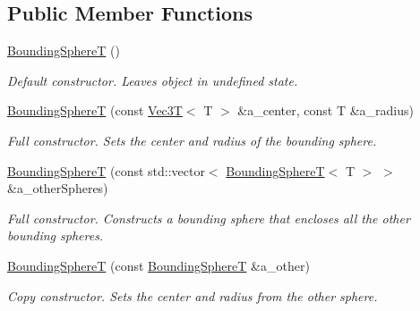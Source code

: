 \subsection*{Public Member Functions}
\begin{DoxyCompactItemize}
\item 
\mbox{\label{classEBGeometry_1_1BoundingVolumes_1_1BoundingSphereT_abb47115bf4bd00e16c885a3b8f54dc87}} 
\hyperlink{classEBGeometry_1_1BoundingVolumes_1_1BoundingSphereT_abb47115bf4bd00e16c885a3b8f54dc87}{Bounding\+SphereT} ()
\begin{DoxyCompactList}\small\item\em Default constructor. Leaves object in undefined state. \end{DoxyCompactList}\item 
\hyperlink{classEBGeometry_1_1BoundingVolumes_1_1BoundingSphereT_a67800669cf2aee6493ea0da5439a34fd}{Bounding\+SphereT} (const \hyperlink{classVec3T}{Vec3T}$<$ T $>$ \&a\+\_\+center, const T \&a\+\_\+radius)
\begin{DoxyCompactList}\small\item\em Full constructor. Sets the center and radius of the bounding sphere. \end{DoxyCompactList}\item 
\hyperlink{classEBGeometry_1_1BoundingVolumes_1_1BoundingSphereT_af360a46fe3463a27f9a718e328aff46e}{Bounding\+SphereT} (const std\+::vector$<$ \hyperlink{classEBGeometry_1_1BoundingVolumes_1_1BoundingSphereT}{Bounding\+SphereT}$<$ T $>$ $>$ \&a\+\_\+other\+Spheres)
\begin{DoxyCompactList}\small\item\em Full constructor. Constructs a bounding sphere that encloses all the other bounding spheres. \end{DoxyCompactList}\item 
\hyperlink{classEBGeometry_1_1BoundingVolumes_1_1BoundingSphereT_ab55488a8ee4b749e8b86c5577735eb3b}{Bounding\+SphereT} (const \hyperlink{classEBGeometry_1_1BoundingVolumes_1_1BoundingSphereT}{Bounding\+SphereT} \&a\+\_\+other)
\begin{DoxyCompactList}\small\item\em Copy constructor. Sets the center and radius from the other sphere. \end{DoxyCompactList}\item 
\mbox{\label{classEBGeometry_1_1BoundingVolumes_1_1BoundingSphereT_a06db6d4588098bda148376ee71f51b91}} 

\end{DoxyCompactItemize}

